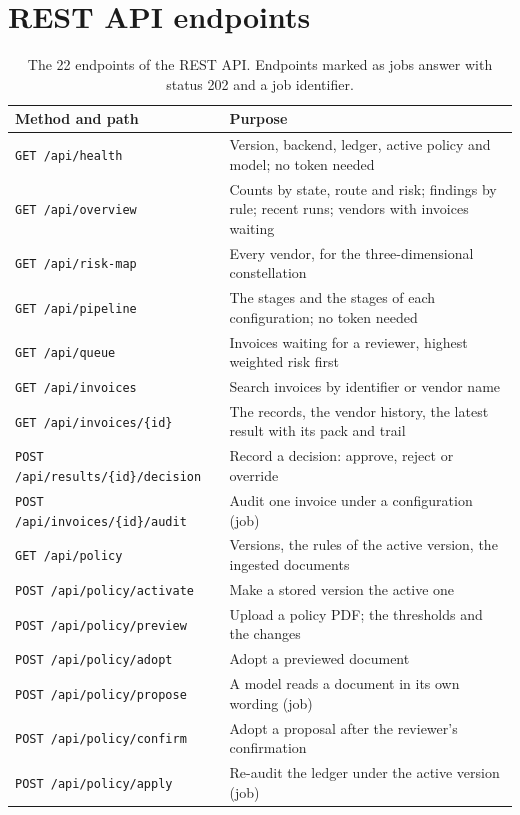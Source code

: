\documentclass[11pt,a4paper]{article}
\begin{document}
\section{REST API endpoints}
\label{app:api}
\begin{table}[htbp]
\caption{The 22 endpoints of the REST API. Endpoints marked as jobs answer with status 202 and a job identifier.}
\label{tab:api}
\centering
\small
\begin{tabular}{L{6.4cm}L{9.3cm}}
\toprule
Method and path & Purpose \\
\midrule
\texttt{GET /api/health} & Version, backend, ledger, active policy and model; no token needed \\
\texttt{GET /api/overview} & Counts by state, route and risk; findings by rule; recent runs; vendors with invoices waiting \\
\texttt{GET /api/risk-map} & Every vendor, for the three-dimensional constellation \\
\texttt{GET /api/pipeline} & The stages and the stages of each configuration; no token needed \\
\texttt{GET /api/queue} & Invoices waiting for a reviewer, highest weighted risk first \\
\texttt{GET /api/invoices} & Search invoices by identifier or vendor name \\
\texttt{GET /api/invoices/\{id\}} & The records, the vendor history, the latest result with its pack and trail \\
\texttt{POST /api/results/\{id\}/decision} & Record a decision: approve, reject or override \\
\texttt{POST /api/invoices/\{id\}/audit} & Audit one invoice under a configuration (job) \\
\texttt{GET /api/policy} & Versions, the rules of the active version, the ingested documents \\
\texttt{POST /api/policy/activate} & Make a stored version the active one \\
\texttt{POST /api/policy/preview} & Upload a policy PDF; the thresholds and the changes \\
\texttt{POST /api/policy/adopt} & Adopt a previewed document \\
\texttt{POST /api/policy/propose} & A model reads a document in its own wording (job) \\
\texttt{POST /api/policy/confirm} & Adopt a proposal after the reviewer's confirmation \\
\texttt{POST /api/policy/apply} & Re-audit the ledger under the active version (job) \\

\end{tabular}
\end{table}
\end{document}

